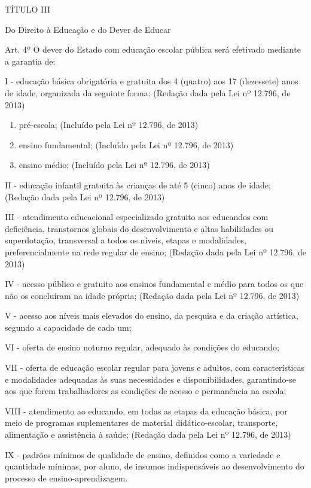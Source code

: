 \documentclass[
]{book}
\begin{document}
TÍTULO III

Do Direito à Educação e do Dever de Educar

Art. 4º O dever do Estado com educação escolar pública será efetivado mediante a garantia de:

I - educação básica obrigatória e gratuita dos 4 (quatro) aos 17 (dezessete) anos de idade, organizada da seguinte forma: (Redação dada pela Lei nº 12.796, de 2013)

\begin{enumerate}
\def\labelenumi{\alph{enumi})}
\item
  pré-escola; (Incluído pela Lei nº 12.796, de 2013)
\item
  ensino fundamental; (Incluído pela Lei nº 12.796, de 2013)
\item
  ensino médio; (Incluído pela Lei nº 12.796, de 2013)
\end{enumerate}

II - educação infantil gratuita às crianças de até 5 (cinco) anos de idade; (Redação dada pela Lei nº 12.796, de 2013)

III - atendimento educacional especializado gratuito aos educandos com deficiência, transtornos globais do desenvolvimento e altas habilidades ou superdotação, transversal a todos os níveis, etapas e modalidades, preferencialmente na rede regular de ensino; (Redação dada pela Lei nº 12.796, de 2013)

IV - acesso público e gratuito aos ensinos fundamental e médio para todos os que não os concluíram na idade própria; (Redação dada pela Lei nº 12.796, de 2013)

V - acesso aos níveis mais elevados do ensino, da pesquisa e da criação artística, segundo a capacidade de cada um;

VI - oferta de ensino noturno regular, adequado às condições do educando;

VII - oferta de educação escolar regular para jovens e adultos, com características e modalidades adequadas às suas necessidades e disponibilidades, garantindo-se aos que forem trabalhadores as condições de acesso e permanência na escola;

VIII - atendimento ao educando, em todas as etapas da educação básica, por meio de programas suplementares de material didático-escolar, transporte, alimentação e assistência à saúde; (Redação dada pela Lei nº 12.796, de 2013)

IX - padrões mínimos de qualidade de ensino, definidos como a variedade e quantidade mínimas, por aluno, de insumos indispensáveis ao desenvolvimento do processo de ensino-aprendizagem.
\end{document}
